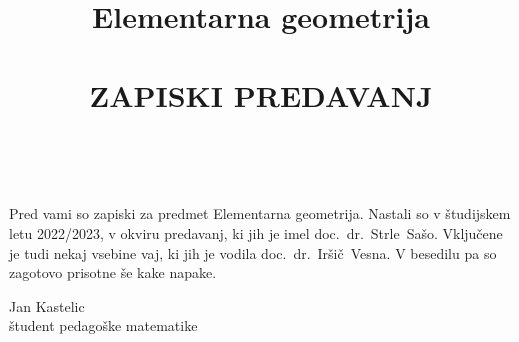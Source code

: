 \documentclass[11pt,a4paper]{book}
\author{}
\title{\Huge{Elementarna geometrija} \\ ~\\\Large{ZAPISKI PREDAVANJ}}
\begin{document}
\frontmatter
\maketitle

\newpage
\thispagestyle{empty}
~

\newpage

\mbox{}
\vfill
Pred vami so zapiski za predmet Elementarna geometrija. 
Nastali so v študijskem letu 2022/2023, v okviru predavanj, ki jih je imel doc.~dr.~Strle~Sašo. 
Vključene je tudi nekaj vsebine vaj, ki jih je vodila doc.~dr.~Iršič~Vesna.
V besedilu pa so zagotovo prisotne še kake napake.
\bigskip
\begin{flushright}
  Jan Kastelic \qquad \qquad \qquad\qquad\qquad\hbox{} \\
  študent pedagoške matematike \qquad\hbox{}
\end{flushright}

\newpage
\thispagestyle{empty}
~

\tableofcontents

\newpage
\thispagestyle{empty}
~

\mainmatter












\end{document}
